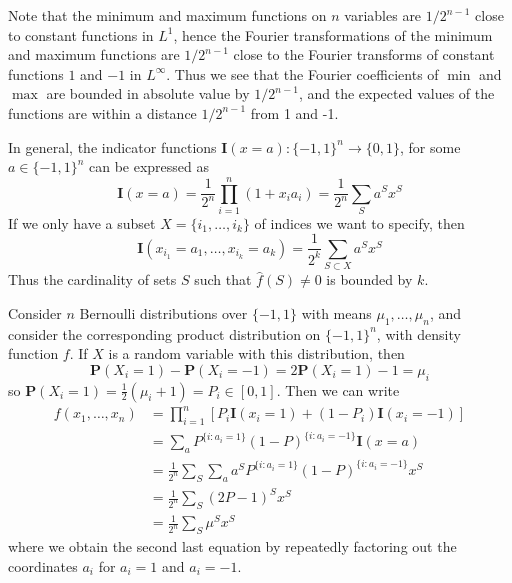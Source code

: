 Note that the minimum and maximum functions on $n$ variables are $1/2^{n-1}$ close to constant functions in $L^1$, hence the Fourier transformations of the minimum and maximum functions are $1/2^{n-1}$ close to the Fourier transforms of constant functions $1$ and $-1$ in $L^\infty$. Thus we see that the Fourier coefficients of $\min$ and $\max$ are bounded in absolute value by $1/2^{n-1}$, and the expected values of the functions are within a distance $1/2^{n-1}$ from 1 and -1.

\begin{example}
    In general, the indicator functions $\mathbf{I}(x = a): \{ -1, 1 \}^n \to \{ 0, 1 \}$, for some $a \in \{ -1, 1 \}^n$ can be expressed as
    \[ \mathbf{I}(x = a) = \frac{1}{2^n} \prod_{i = 1}^n \left( 1 + x_i a_i \right) = \frac{1}{2^n} \sum_S a^S x^S \]
    If we only have a subset $X = \{ i_1, \dots, i_k \}$ of indices we want to specify, then
    \[ \mathbf{I}(x_{i_1} = a_1, \dots, x_{i_k} = a_k) = \frac{1}{2^k} \sum_{S \subset X} a^S x^S \]
    Thus the cardinality of sets $S$ such that $\widehat{f}(S) \neq 0$ is bounded by $k$.
\end{example}

\begin{example}
    Consider $n$ Bernoulli distributions over $\{ -1, 1 \}$ with means $\mu_1, \dots, \mu_n$, and consider the corresponding product distribution on $\{ -1, 1 \}^n$, with density function $f$. If $X$ is a random variable with this distribution, then
    \[ \mathbf{P}(X_i = 1) - \mathbf{P}(X_i = -1) = 2 \mathbf{P}(X_i = 1) - 1 = \mu_i \]
    so $\mathbf{P}(X_i = 1) = \frac{1}{2} (\mu_i + 1) = P_i \in [0,1]$. Then we can write
    \begin{align*}
        f(x_1, \dots, x_n) &= \prod_{i = 1}^n \left[ P_i \mathbf{I}(x_i = 1) + (1 - P_i) \mathbf{I}(x_i = -1) \right]\\
        &= \sum_a P^{\{ i : a_i = 1 \}} (1 - P)^{\{ i : a_i = -1 \}} \mathbf{I}(x = a)\\
        &= \frac{1}{2^n} \sum_S \sum_a a^S P^{\{ i : a_i = 1 \}} (1 - P)^{\{ i : a_i = -1 \}} x^S\\
        &= \frac{1}{2^n} \sum_S (2 P - 1)^S x^S\\
        &= \frac{1}{2^n} \sum_S \mu^S x^S
    \end{align*}
    where we obtain the second last equation by repeatedly factoring out the coordinates $a_i$ for $a_i = 1$ and $a_i = -1$.
\end{example}

